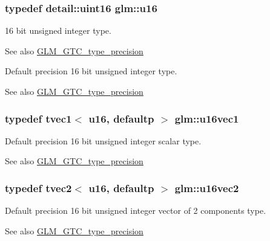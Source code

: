\subsubsection[{u16}]{\setlength{\rightskip}{0pt plus 5cm}typedef {\bf detail\+::uint16} {\bf glm\+::u16}}\label{group__gtc__type__precision_gae7a1571503f83d2264ddfa705a6b082a}
16 bit unsigned integer type. \begin{DoxySeeAlso}{See also}
\hyperlink{group__gtc__type__precision}{G\+L\+M\+\_\+\+G\+T\+C\+\_\+type\+\_\+precision}
\end{DoxySeeAlso}
Default precision 16 bit unsigned integer type. \begin{DoxySeeAlso}{See also}
\hyperlink{group__gtc__type__precision}{G\+L\+M\+\_\+\+G\+T\+C\+\_\+type\+\_\+precision} 
\end{DoxySeeAlso}
\hypertarget{group__gtc__type__precision_ga809cb55e5fed3456686aae96e7e8684c}{}
\subsubsection[{u16vec1}]{\setlength{\rightskip}{0pt plus 5cm}typedef tvec1$<$ u16, defaultp $>$ {\bf glm\+::u16vec1}}\label{group__gtc__type__precision_ga809cb55e5fed3456686aae96e7e8684c}
Default precision 16 bit unsigned integer scalar type. \begin{DoxySeeAlso}{See also}
\hyperlink{group__gtc__type__precision}{G\+L\+M\+\_\+\+G\+T\+C\+\_\+type\+\_\+precision} 
\end{DoxySeeAlso}
\hypertarget{group__gtc__type__precision_ga10e8900b9610f930772aa55aee8e3121}{}
\subsubsection[{u16vec2}]{\setlength{\rightskip}{0pt plus 5cm}typedef tvec2$<$ u16, defaultp $>$ {\bf glm\+::u16vec2}}\label{group__gtc__type__precision_ga10e8900b9610f930772aa55aee8e3121}
Default precision 16 bit unsigned integer vector of 2 components type. \begin{DoxySeeAlso}{See also}
\hyperlink{group__gtc__type__precision}{G\+L\+M\+\_\+\+G\+T\+C\+\_\+type\+\_\+precision} 
\end{DoxySeeAlso}
\hypertarget{group__gtc__type__precision_ga947d0d003e016eaf2038d6843b427257}{}
